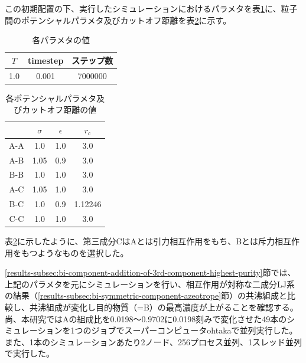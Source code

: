 \documentclass[titlepage]{jsreport}
\begin{document}
\newpage
この初期配置の下、実行したシミュレーションにおけるパラメタを表\ref{table:bi-component-addition-of-3rd-component-parameter}に、粒子間のポテンシャルパラメタ及びカットオフ距離を表\ref{table:bi-component-addition-of-3rd-component-potential-parameter}に示す。

\begin{table}[htbp]
    \begin{center}
        \caption{各パラメタの値}
        \label{table:bi-component-addition-of-3rd-component-parameter}
        \begin{tabular}{c c c}
            $T$ & timestep & ステップ数 \\
            \hline
            1.0 & 0.001 & 7000000 \\
        \end{tabular}
    \end{center}
\end{table}

\begin{table}[htbp]
    \begin{center}
        \caption{各ポテンシャルパラメタ及びカットオフ距離の値}
        \label{table:bi-component-addition-of-3rd-component-potential-parameter}
        \begin{tabular}{c c c c}
            & $\sigma$ & $\epsilon$ & $r_c$ \\
            \hline
            A-A & 1.0 & 1.0 & 3.0 \\
            A-B & 1.05 & 0.9 & 3.0 \\
            B-B & 1.0 & 1.0 & 3.0 \\
            A-C & 1.05 & 1.0 & 3.0 \\
            B-C & 1.0 & 0.9 & 1.12246 \\
            C-C & 1.0 & 1.0 & 3.0
        \end{tabular}
    \end{center}
\end{table}

表\ref{table:bi-component-addition-of-3rd-component-potential-parameter}に示したように、第三成分CはAとは引力相互作用をもち、Bとは斥力相互作用をもつようなものを選択した。

\ref{results-subsec:bi-component-addition-of-3rd-component-highest-purity}節では、上記のパラメタを元にシミュレーションを行い、相互作用が対称な二成分LJ系の結果（\ref{results-subsec:bi-symmetric-component-azeotrope}節）の共沸組成と比較し、共沸組成が変化し目的物質（=B）の最高濃度が上がることを確認する。尚、本研究ではAの組成比を0.0198〜0.9702に0.0198刻みで変化させた49本のシミュレーションを1つのジョブでスーパーコンピュータohtakaで並列実行した。また、1本のシミュレーションあたり2ノード、256プロセス並列、1スレッド並列で実行した。
\end{document}
